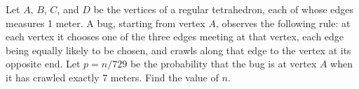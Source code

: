 Let $A$, $B$, $C$, and $D$ be the vertices of a regular tetrahedron, each of whose edges measures 1 meter.  A bug, starting from vertex $A$, observes the following rule: at each vertex it chooses one of the three edges meeting at that vertex, each edge being equally likely to be chosen, and crawls along that edge to the vertex at its opposite end.  Let $p = n/729$ be the probability that the bug is at vertex $A$ when it has crawled exactly 7 meters.  Find the value of $n$.